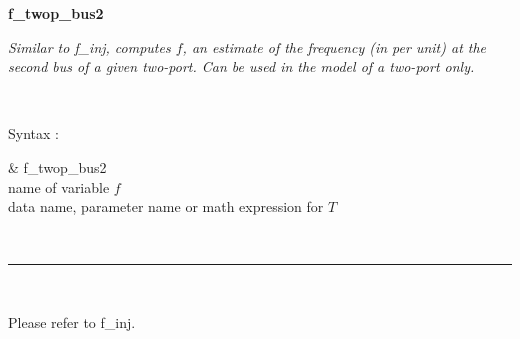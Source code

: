 \hypertarget{link_to_ftwop2}{}{\Large \bf f\_twop\_bus2}

{\it Similar to f\_inj, computes $f$, an estimate of the frequency (in per unit) at the second bus of a given two-port. Can be used in the model of a two-port only.}

~

Syntax : \hspace*{10ex}\parbox[t]{\textwidth}{\sf 
\& f\_twop\_bus2 \\
name of variable $f$\\
data name, parameter name or math expression for $T$
}

~ \hrule ~

Please refer to f\_inj.
